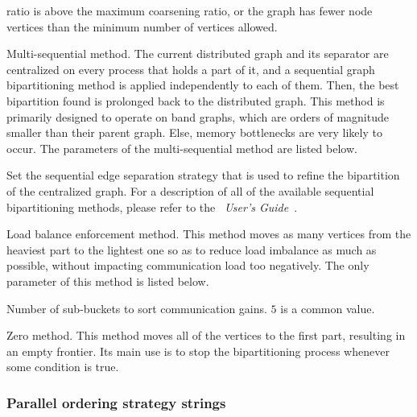 \begin{itemize}
\begin{itemize}
\begin{itemize}
ratio is above the maximum coarsening ratio, or the graph
has fewer node vertices than the minimum number of vertices allowed.
\end{itemize}
\iteme[{\tt q}]
Multi-sequential method. The current distributed graph and its
separator are centralized on every process that holds a part of it, and
a sequential graph bipartitioning method is applied independently to each
of them. Then, the best bipartition found is prolonged back to the
distributed graph. This method is primarily designed to operate on
band graphs, which are orders of magnitude smaller than their parent
graph. Else, memory bottlenecks are very likely to occur.
The parameters of the multi-sequential method are listed below.
\begin{itemize}
\iteme[{\tt strat=}{\it strat}]
Set the sequential edge separation strategy that is used to refine
the bipartition of the centralized graph. For a description of all of
the available sequential bipartitioning methods, please refer to the
{\it\scotch\ User's Guide}~\scotchcitesuser.
\end{itemize}
\iteme[{\tt x}]
Load balance enforcement method. This method moves as many vertices
from the heaviest part to the lightest one so as to reduce load
imbalance as much as possible, without impacting communication load
too negatively. The only parameter of this method is listed below.
\begin{itemize}
\iteme[{\tt sbbt=}{\it nbr}]
Number of sub-buckets to sort communication gains. $5$ is a common
value.
\end{itemize}
\iteme[{\tt z}]
Zero method. This method moves all of the vertices to the first
part, resulting in an empty frontier. Its main use is to stop the
bipartitioning process whenever some condition is true.
\end{itemize}
\end{itemize}

\subsubsection{Parallel ordering strategy strings}
\label{sec-lib-format-pord}

